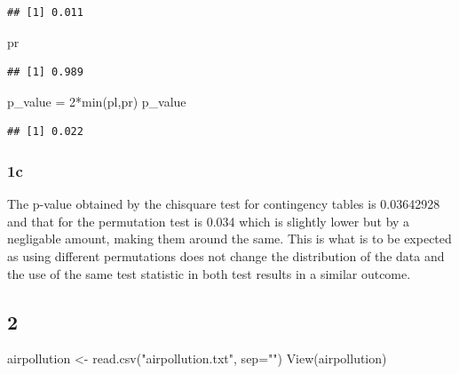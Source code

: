 \documentclass[
]{article}
\newenvironment{Shaded}{\begin{snugshade}}{\end{snugshade}}
\newcommand{\AttributeTok}[1]{\textcolor[rgb]{0.77,0.63,0.00}{#1}}
\newcommand{\DecValTok}[1]{\textcolor[rgb]{0.00,0.00,0.81}{#1}}
\newcommand{\FunctionTok}[1]{\textcolor[rgb]{0.00,0.00,0.00}{#1}}
\newcommand{\NormalTok}[1]{#1}
\newcommand{\OtherTok}[1]{\textcolor[rgb]{0.56,0.35,0.01}{#1}}
\newcommand{\SpecialCharTok}[1]{\textcolor[rgb]{0.00,0.00,0.00}{#1}}
\newcommand{\StringTok}[1]{\textcolor[rgb]{0.31,0.60,0.02}{#1}}
\begin{document}
\begin{verbatim}
## [1] 0.011
\end{verbatim}

\begin{Shaded}
\begin{Highlighting}[]
\NormalTok{pr}
\end{Highlighting}
\end{Shaded}

\begin{verbatim}
## [1] 0.989
\end{verbatim}

\begin{Shaded}
\begin{Highlighting}[]
\NormalTok{p\_value }\OtherTok{=} \DecValTok{2}\SpecialCharTok{*}\FunctionTok{min}\NormalTok{(pl,pr)}
\NormalTok{p\_value}
\end{Highlighting}
\end{Shaded}

\begin{verbatim}
## [1] 0.022
\end{verbatim}

\hypertarget{c}{%
\subsubsection{1c}\label{c}}

The p-value obtained by the chisquare test for contingency tables is
0.03642928 and that for the permutation test is 0.034 which is slightly
lower but by a negligable amount, making them around the same. This is
what is to be expected as using different permutations does not change
the distribution of the data and the use of the same test statistic in
both test results in a similar outcome.

\hypertarget{section-1}{%
\subsection{2}\label{section-1}}

\begin{Shaded}
\begin{Highlighting}[]
\NormalTok{airpollution }\OtherTok{\textless{}{-}} \FunctionTok{read.csv}\NormalTok{(}\StringTok{"airpollution.txt"}\NormalTok{, }\AttributeTok{sep=}\StringTok{""}\NormalTok{)}
\FunctionTok{View}\NormalTok{(airpollution)}
\end{Highlighting}
\end{Shaded}
\end{document}
